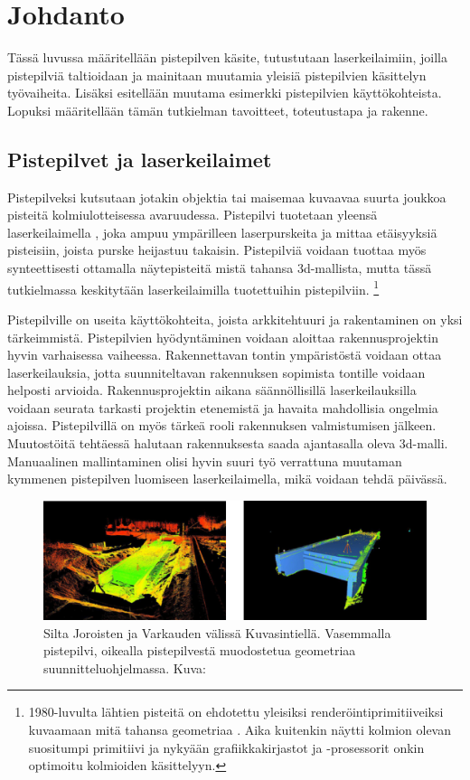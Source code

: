 \section{Johdanto}
Tässä luvussa määritellään pistepilven käsite, tutustutaan laserkeilaimiin, joilla pistepilviä taltioidaan ja mainitaan muutamia yleisiä pistepilvien käsittelyn työvaiheita. Lisäksi esitellään muutama esimerkki pistepilvien käyttökohteista. Lopuksi määritellään tämän tutkielman tavoitteet, toteutustapa ja rakenne.

\subsection{Pistepilvet ja laserkeilaimet}\label{laserkeilaimet}

Pistepilveksi kutsutaan jotakin objektia tai maisemaa kuvaavaa suurta joukkoa pisteitä kolmiulotteisessa avaruudessa. Pistepilvi tuotetaan yleensä laserkeilaimella , joka ampuu ympärilleen laserpurskeita ja mittaa etäisyyksiä pisteisiin, joista purske heijastuu takaisin. Pistepilviä voidaan tuottaa myös synteettisesti ottamalla näytepisteitä mistä tahansa 3d-mallista, mutta tässä tutkielmassa keskitytään laserkeilaimilla tuotettuihin pistepilviin. \footnote{1980-luvulta lähtien pisteitä on ehdotettu yleisiksi renderöintiprimitiiveiksi kuvaamaan mitä tahansa geometriaa \cite{Whitted}. Aika kuitenkin näytti kolmion olevan suositumpi primitiivi ja nykyään grafiikkakirjastot ja -prosessorit onkin optimoitu kolmioiden käsittelyyn.}

Pistepilville on useita käyttökohteita, joista arkkitehtuuri ja rakentaminen on yksi tärkeimmistä. Pistepilvien hyödyntäminen voidaan aloittaa rakennusprojektin hyvin varhaisessa vaiheessa. Rakennettavan tontin ympäristöstä voidaan ottaa laserkeilauksia, jotta suunniteltavan rakennuksen sopimista tontille voidaan helposti arvioida. Rakennusprojektin aikana säännöllisillä laserkeilauksilla voidaan seurata tarkasti projektin etenemistä ja havaita mahdollisia ongelmia ajoissa. Pistepilvillä on myös tärkeä rooli rakennuksen valmistumisen jälkeen. Muutostöitä tehtäessä halutaan rakennuksesta saada ajantasalla oleva 3d-malli. Manuaalinen mallintaminen olisi hyvin suuri työ verrattuna muutaman kymmenen pistepilven luomiseen laserkeilaimella, mikä voidaan tehdä päivässä. \cite{bim} 

\begin{figure}
    \centering
    \includegraphics[width=\textwidth]{img/silta.png}
    \caption{Silta Joroisten ja Varkauden välissä Kuvasintiellä. Vasemmalla pistepilvi, oikealla pistepilvestä muodostetua geometriaa suunnitteluohjelmassa. Kuva: \cite{silta}}
    \label{silt}
\end{figure}

